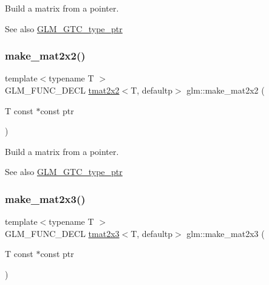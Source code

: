 Build a matrix from a pointer. \begin{DoxySeeAlso}{See also}
\hyperlink{group__gtc__type__ptr}{G\+L\+M\+\_\+\+G\+T\+C\+\_\+type\+\_\+ptr} 
\end{DoxySeeAlso}
\mbox{\label{group__gtc__type__ptr_gadb29e510762e1042069cb28bf24ae990}} 
\subsubsection{\texorpdfstring{make\+\_\+mat2x2()}{make\_mat2x2()}}
{\footnotesize\ttfamily template$<$typename T $>$ \\
G\+L\+M\+\_\+\+F\+U\+N\+C\+\_\+\+D\+E\+CL \hyperlink{structglm_1_1tmat2x2}{tmat2x2}$<$T, defaultp$>$ glm\+::make\+\_\+mat2x2 (\begin{DoxyParamCaption}\item[{T const $\ast$const}]{ptr }\end{DoxyParamCaption})}

Build a matrix from a pointer. \begin{DoxySeeAlso}{See also}
\hyperlink{group__gtc__type__ptr}{G\+L\+M\+\_\+\+G\+T\+C\+\_\+type\+\_\+ptr} 
\end{DoxySeeAlso}
\mbox{\label{group__gtc__type__ptr_ga37988c6dd941f617cdfab86d54375fc1}} 
\subsubsection{\texorpdfstring{make\+\_\+mat2x3()}{make\_mat2x3()}}
{\footnotesize\ttfamily template$<$typename T $>$ \\
G\+L\+M\+\_\+\+F\+U\+N\+C\+\_\+\+D\+E\+CL \hyperlink{structglm_1_1tmat2x3}{tmat2x3}$<$T, defaultp$>$ glm\+::make\+\_\+mat2x3 (\begin{DoxyParamCaption}\item[{T const $\ast$const}]{ptr }\end{DoxyParamCaption})}

